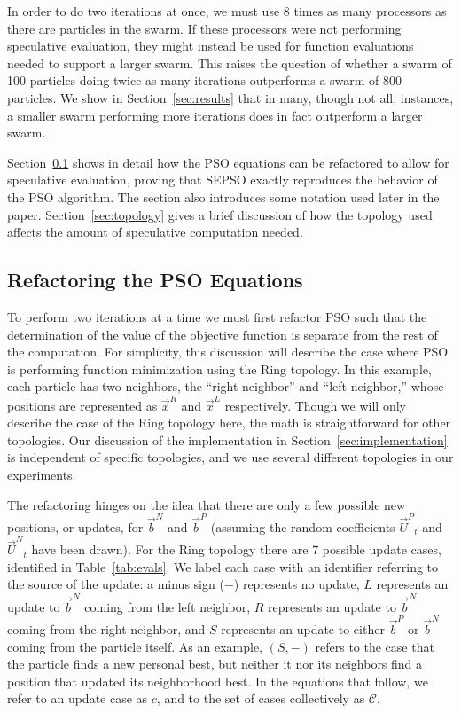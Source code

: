 \documentclass[smallcondensed]{svjour3}
\renewcommand{\sec}[1]{Section~\ref{sec:#1}}
\providecommand{\pers}{\ensuremath{P}}
\providecommand{\neigh}{\ensuremath{N}}
\providecommand{\leftind}{\ensuremath{L}}
\providecommand{\rightind}{\ensuremath{R}}
\providecommand{\nURand}{\ensuremath{\Vec{U}^\neigh}}
\providecommand{\pURand}{\ensuremath{\Vec{U}^\pers}}
\providecommand{\nbest}{\ensuremath{\Vec{b}^\neigh}}
\providecommand{\pbest}{\ensuremath{\Vec{b}^\pers}}
\providecommand{\leftn}{\ensuremath{\Vec{x}^\leftind}}
\providecommand{\rightn}{\ensuremath{\Vec{x}^\rightind}}
\providecommand{\caseset}{\ensuremath{\mathcal{C}}}
\providecommand{\casegen}{\ensuremath{c}}
\providecommand{\casexn}{\ensuremath{(S,-)}}
\begin{document}
In order to do two iterations at once, we must use 8 times as many processors
as there are particles in the swarm.  If these processors were not performing
speculative evaluation, they might instead be used for function evaluations
needed to support a larger swarm.  This raises the question of whether a swarm
of 100 particles doing twice as many iterations outperforms a swarm of 800
particles.  We show in \sec{results} that in many, though not all, instances, a
smaller swarm performing more iterations does in fact outperform a larger
swarm.

\sec{proof} shows in detail how the PSO equations can be refactored to allow
for speculative evaluation, proving that SEPSO exactly reproduces the behavior
of the PSO algorithm.  The section also introduces some notation used later in
the paper.  \sec{topology} gives a brief discussion of how the topology used
affects the amount of speculative computation needed.

\subsection{Refactoring the PSO Equations}
\label{sec:proof}

To perform two iterations at a time we must first refactor PSO such that the
determination of the value of the objective function is separate from the rest
of the computation.  For simplicity, this discussion will describe the case
where PSO is performing function minimization using the Ring topology.  In this
example, each particle has two neighbors, the ``right neighbor'' and ``left
neighbor,'' whose positions are represented as $\rightn$ and $\leftn$
respectively.  Though we will only describe the case of the Ring topology here,
the math is straightforward for other topologies.  Our discussion of the
implementation in \sec{implementation} is independent of specific topologies,
and we use several different topologies in our experiments.

The refactoring hinges on the idea that there are only a few possible new
positions, or updates, for $\nbest$ and $\pbest$ (assuming the random
coefficients $\pURand_{t}$ and $\nURand_{t}$ have been drawn).  For the Ring
topology there are 7 possible update cases, identified in
Table~\ref{tab:evals}.  We label each case with an identifier referring to the
source of the update: a minus sign ($-$) represents no update, $L$ represents
an update to $\nbest$ coming from the left neighbor, $R$ represents an update
to $\nbest$ coming from the right neighbor, and $S$ represents an update to
either $\pbest$ or $\nbest$ coming from the particle itself.  As an example,
$\casexn$ refers to the case that the particle finds a new personal best, but
neither it nor its neighbors find a position that updated its neighborhood
best.  In the equations that follow, we refer to an update case as $\casegen$,
and to the set of cases collectively as $\caseset$.
\end{document}
